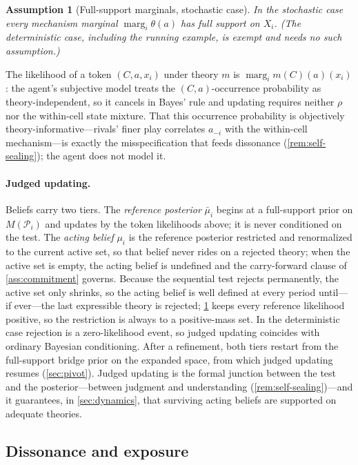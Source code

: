 \documentclass[11pt]{article}
\newtheorem{assumption}{Assumption}[section]
\theoremstyle{definition}
\newcommand{\marg}[1]{\operatorname{marg}_{#1}}
\begin{document}
\begin{assumption}[Full-support marginals, stochastic case]
\label{ass:full-support}
In the stochastic case every mechanism marginal $\marg{i}\theta(a)$ has full support on $X_i$.
(The deterministic case, including the running example, is exempt and needs no such assumption.)
\end{assumption}

The likelihood of a token $(C,a,x_i)$ under theory $m$ is $\marg{i}m(C)(a)(x_i)$: the agent's subjective model treats the $(C,a)$-occurrence probability as theory-independent, so it cancels in Bayes' rule and updating requires neither $\rho$ nor the within-cell state mixture.
That this occurrence probability is objectively theory-informative---rivals' finer play correlates $a_{-i}$ with the within-cell mechanism---is exactly the misspecification that feeds dissonance (\cref{rem:self-sealing}); the agent does not model it.

\paragraph{Judged updating.}
Beliefs carry two tiers.
The \emph{reference posterior} $\bar\mu_i$ begins at a full-support prior on $M(\mathcal P_i)$ and updates by the token likelihoods above; it is never conditioned on the test.
The \emph{acting belief} $\mu_i$ is the reference posterior restricted and renormalized to the current active set, so that belief never rides on a rejected theory; when the active set is empty, the acting belief is undefined and the carry-forward clause of \cref{ass:commitment} governs.
Because the sequential test rejects permanently, the active set only shrinks, so the acting belief is well defined at every period until---if ever---the last expressible theory is rejected; \cref{ass:full-support} keeps every reference likelihood positive, so the restriction is always to a positive-mass set.
In the deterministic case rejection is a zero-likelihood event, so judged updating coincides with ordinary Bayesian conditioning.
After a refinement, both tiers restart from the full-support bridge prior on the expanded space, from which judged updating resumes (\cref{sec:pivot}).
Judged updating is the formal junction between the test and the posterior---between judgment and understanding (\cref{rem:self-sealing})---and it guarantees, in \cref{sec:dynamics}, that surviving acting beliefs are supported on adequate theories.

\subsection{Dissonance and exposure}
\end{document}
